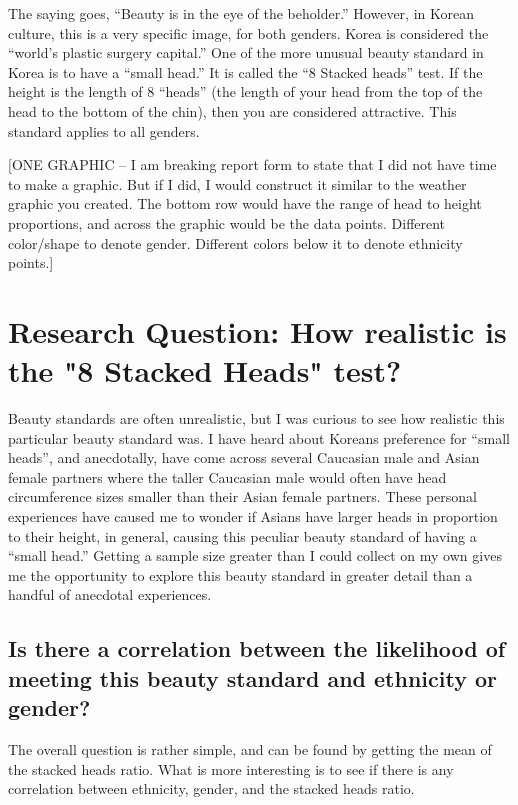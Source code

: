 \documentclass[]{article}
\begin{document}
The saying goes, \enquote{Beauty is in the eye of the beholder.}
However, in Korean culture, this is a very specific image, for both
genders. Korea is considered the \enquote{world's plastic surgery
capital.} \citep{Jacobs:2018} One of the more unusual beauty standard in
Korea is to have a \enquote{small head.} It is called the \enquote{8
Stacked heads} test. If the height is the length of 8 \enquote{heads}
(the length of your head from the top of the head to the bottom of the
chin), then you are considered attractive. This standard applies to all
genders. \citep{Koreaboo:2017}

{[}ONE GRAPHIC -- I am breaking report form to state that I did not have
time to make a graphic. But if I did, I would construct it similar to
the weather graphic you created. The bottom row would have the range of
head to height proportions, and across the graphic would be the data
points. Different color/shape to denote gender. Different colors below
it to denote ethnicity points.{]}

\section{Research Question:  How realistic is the "8 Stacked Heads" test?}
\label{sec:rq}

Beauty standards are often unrealistic, but I was curious to see how
realistic this particular beauty standard was. I have heard about
Koreans preference for \enquote{small heads}, and anecdotally, have come
across several Caucasian male and Asian female partners where the taller
Caucasian male would often have head circumference sizes smaller than
their Asian female partners. These personal experiences have caused me
to wonder if Asians have larger heads in proportion to their height, in
general, causing this peculiar beauty standard of having a
\enquote{small head.} Getting a sample size greater than I could collect
on my own gives me the opportunity to explore this beauty standard in
greater detail than a handful of anecdotal experiences.

\subsection{Is there a correlation between the likelihood of meeting this beauty standard and ethnicity or gender?}
\label{sec:rq2}

The overall question is rather simple, and can be found by getting the
mean of the stacked heads ratio. What is more interesting is to see if
there is any correlation between ethnicity, gender, and the stacked
heads ratio.
\end{document}
